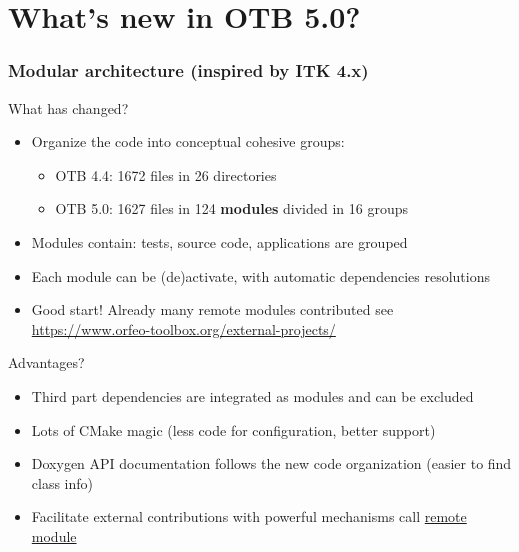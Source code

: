 \documentclass[8pt]{beamer}
\begin{document}
\section{What's new in OTB 5.0?}

\begin{frame}
\frametitle{Modular architecture (inspired by ITK 4.x)}
\begin{block}{What has changed?}
\begin{itemize}
\item  Organize the code into conceptual cohesive groups:
  \begin{itemize}
    \item OTB 4.4: 1672 files in 26 directories
    \item OTB 5.0: 1627 files in 124 \textbf{modules} divided in 16 groups
  \end{itemize}
\item Modules contain: tests, source code, applications are grouped
\item Each module can be (de)activate, with automatic dependencies resolutions
\item Good start! Already many remote modules contributed see \url{https://www.orfeo-toolbox.org/external-projects/}
\end{itemize}
\end{block}

\begin{block}{Advantages?}
\begin{itemize}
\item Third part dependencies are integrated as modules and can be excluded
\item Lots of CMake magic (less code for configuration, better support)
\item Doxygen API documentation follows the new code organization (easier to
  find class info)
\item Facilitate external contributions with powerful mechanisms call
  \href{https://www.orfeo-toolbox.org/external-projects/}{\alert{remote module}}
\end{itemize}
\end{block}
\end{frame}
\end{document}
